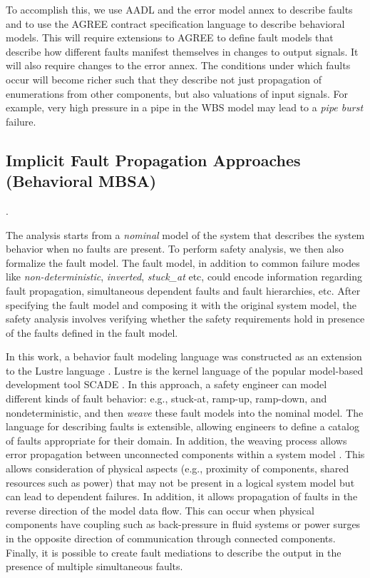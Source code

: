 To accomplish this, we use AADL and the error model annex to describe faults and to use the AGREE contract specification language to describe behavioral models. This will require extensions to AGREE to define fault models that describe how different faults manifest themselves in changes to output signals. It will also require changes to the error annex. The conditions under which faults occur will become richer such that they describe not just propagation of enumerations from other components, but also valuations of input signals. For example, very high pressure in a pipe in the WBS model may lead to a \textit{pipe burst} failure. 


\subsection{Implicit Fault Propagation Approaches (Behavioral MBSA)}

.

The analysis starts from a {\em nominal} model of the system that describes the system behavior when no faults are present.  To perform safety analysis, we then also formalize the fault model. The fault model, in addition to common failure modes like \emph{non-deterministic}, \emph{inverted}, \emph{stuck\_at} etc, could encode information
regarding fault propagation, simultaneous dependent faults and fault hierarchies, etc.
After specifying the fault model and composing it with the original system model, the safety analysis involves verifying whether the safety requirements hold in presence of the faults defined in the fault model.


In this work, a behavior fault modeling language was constructed as an extension to the Lustre language \cite{Halbwachs91:IEEE}. Lustre is the kernel language of the popular model-based development tool SCADE \cite{SCADE}. In this approach, a safety engineer can model different kinds of fault behavior: e.g., stuck-at, ramp-up, ramp-down, and nondeterministic, and then {\em weave} these fault models into the nominal model. The language for describing faults is extensible, allowing engineers to define a catalog of faults appropriate for their domain. In addition, the weaving process allows error propagation between unconnected components within a system model \cite{Joshi07:Hase}. This allows consideration of physical aspects (e.g., proximity of components, shared resources such as power) that may not be present in a logical system model but can lead to dependent failures. In addition, it allows propagation of faults in the reverse direction of the model data flow. This can occur when physical components have coupling such as back-pressure in fluid systems or power surges in the opposite direction of communication through connected components. Finally, it is possible to create fault mediations to describe the output in the presence of multiple simultaneous faults.




